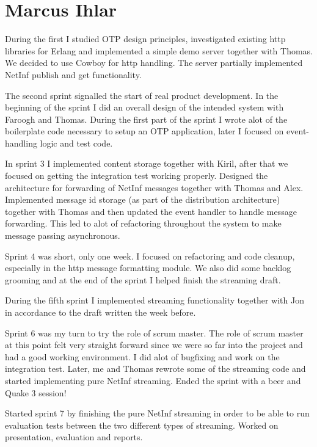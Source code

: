 \section{Marcus Ihlar}
During the first I studied OTP design principles, investigated existing http libraries for Erlang and implemented a simple demo server together with Thomas. We decided to use Cowboy for http handling. The server partially implemented NetInf publish and get functionality.

The second sprint signalled the start of real product development. In the beginning of the sprint I did an overall design of the intended system with Faroogh and Thomas. During the first part of the sprint I wrote alot of the boilerplate code necessary to setup an OTP application, later I focused on event-handling logic and test code.

In sprint 3 I implemented content storage together with Kiril, after that we focused on getting the integration test working properly. Designed the architecture for forwarding of NetInf messages together with Thomas and Alex. Implemented message id storage (as part of the distribution architecture) together with Thomas and then updated the event handler to handle message forwarding. This led to alot of refactoring throughout the system to make message passing asynchronous. 

Sprint 4 was short, only one week. I focused on refactoring and code cleanup, especially in the http message formatting module. We also did some backlog grooming and at the end of the sprint I helped finish the streaming draft.

During the fifth sprint I implemented streaming functionality together with Jon in accordance to the draft written the week before. 

Sprint 6 was my turn to try the role of scrum master. The role of scrum master at this point felt very straight forward since we were so far into the project and had a good working environment. I did alot of bugfixing and work on the integration test. Later, me and Thomas rewrote some of the streaming code and started implementing pure NetInf streaming. Ended the sprint with a beer and Quake 3 session!

Started sprint 7 by finishing the pure NetInf streaming in order to be able to run evaluation tests between the two different types of streaming. Worked on presentation, evaluation and reports.
 

 



